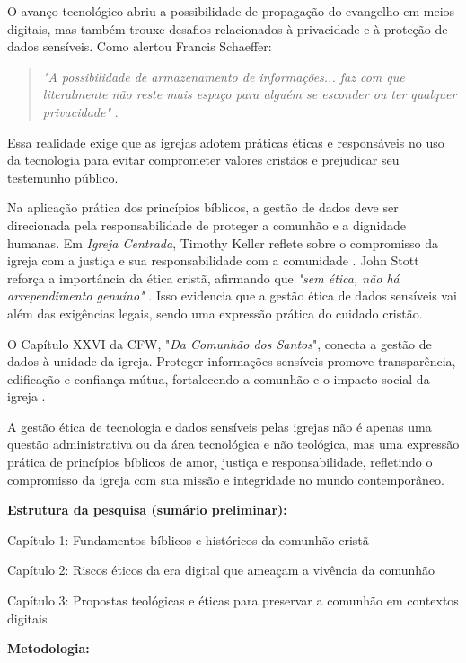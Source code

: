 \documentclass[12pt,a4paper]{article}
\begin{document}
O avanço tecnológico abriu a possibilidade de propagação do evangelho em meios digitais, mas também trouxe desafios relacionados à privacidade e à proteção de dados sensíveis. Como alertou Francis Schaeffer:

\begin{quote}
\textit{"A possibilidade de armazenamento de informações... faz com que literalmente não reste mais espaço para alguém se esconder ou ter qualquer privacidade"} \cite[p. 180]{schaeffer2002}.
\end{quote}

Essa realidade exige que as igrejas adotem práticas éticas e responsáveis no uso da tecnologia para evitar comprometer valores cristãos e prejudicar seu testemunho público.

Na aplicação prática dos princípios bíblicos, a gestão de dados deve ser direcionada pela responsabilidade de proteger a comunhão e a dignidade humanas. Em \textit{Igreja Centrada}, Timothy Keller reflete sobre o compromisso da igreja com a justiça e sua responsabilidade com a comunidade \cite[p. 209]{keller2014}. John Stott reforça a importância da ética cristã, afirmando que \textit{"sem ética, não há arrependimento genuíno"} \cite[p. 51]{stott2008}. Isso evidencia que a gestão ética de dados sensíveis vai além das exigências legais, sendo uma expressão prática do cuidado cristão.

O Capítulo XXVI da CFW, "\textit{Da Comunhão dos Santos}", conecta a gestão de dados à unidade da igreja. Proteger informações sensíveis promove transparência, edificação e confiança mútua, fortalecendo a comunhão e o impacto social da igreja \cite{cfw}.

A gestão ética de tecnologia e dados sensíveis pelas igrejas não é apenas uma questão administrativa ou da área tecnológica e não teológica, mas uma expressão prática de princípios bíblicos de amor, justiça e responsabilidade, refletindo o compromisso da igreja com sua missão e integridade no mundo contemporâneo.

\noindent
\textbf{Estrutura da pesquisa (sumário preliminar):}

\noindent
Capítulo 1: Fundamentos bíblicos e históricos da comunhão cristã

\noindent
Capítulo 2: Riscos éticos da era digital que ameaçam a vivência da comunhão

\noindent
Capítulo 3: Propostas teológicas e éticas para preservar a comunhão em contextos digitais

\noindent
\textbf{Metodologia:}
\end{document}
